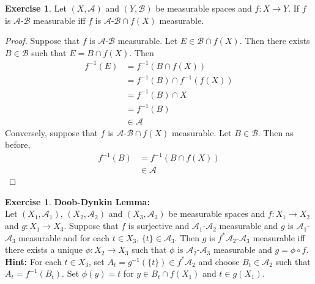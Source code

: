 \documentclass[12pt]{amsart}
\theoremstyle{definition}
\newtheorem{ex}[definition]{Exercise}
\newcommand{\MA}{\mathcal{A}}
\newcommand{\MB}{\mathcal{B}}
\begin{document}
	\begin{ex}
		Let $(X, \MA)$ and $(Y, \MB)$ be measurable spaces and $f: X \rightarrow Y$. If $f$ is $\MA$-$\MB$ measurable iff $f$ is $\MA$-$\MB \cap f(X)$ measurable.
	\end{ex}	
	
	\begin{proof}
		Suppose that $f$ is $\MA$-$\MB$ measurable. Let $E \in \MB \cap f(X)$. Then there exists $B \in \MB$ such that $E = B \cap f(X)$. Then 
		\begin{align*}
			f^{-1}(E)
			&= f^{-1}(B \cap f(X)) \\
			&= f^{-1}(B) \cap f^{-1}(f(X)) \\
			&= f^{-1}(B) \cap X \\
			&= f^{-1}(B) \\
			& \in \MA
		\end{align*}
		Conversely, suppose that $f$ is  $\MA$-$\MB \cap f(X)$ measurable. Let $B \in \MB$. Then as before, 
		\begin{align*}
			f^{-1}(B) 
			&= f^{-1}(B \cap f(X))  \\
			& \in \MA 
		\end{align*}
	\end{proof}
	
	\begin{ex}\textbf{Doob-Dynkin Lemma:} \\
		Let $(X_1, \MA_1)$, $(X_2, \MA_2)$ and $(X_3, \MA_3)$ be measurable spaces and $f: X_1 \rightarrow X_2$ and $g:X_1 \rightarrow X_3$. Suppose that $f$ is surjective and $\MA_1$-$\MA_2$ measurable and $g$ is $\MA_1$-$\MA_3$ measurable and for each $t \in X_3$, $\{t\} \in \MA_3$. Then $g$ is $f^*\MA_2$-$\MA_3$ measurable iff there exists a unique $\phi: X_2 \rightarrow X_3$ such that $\phi$ is $\MA_2$-$\MA_3$ measurable and $g = \phi \circ f$. \\
		\textbf{Hint:} For each $t \in X_3$, set $A_t = g^{-1}(\{t\}) \in f^* \MA_2$ and choose $B_t \in \MA_2$ such that $A_t = f^{-1}(B_t)$. Set $\phi(y) = t$ for $y \in B_t \cap f(X_1)$ and $t \in g(X_1)$.
	\end{ex}
	
\end{document}
